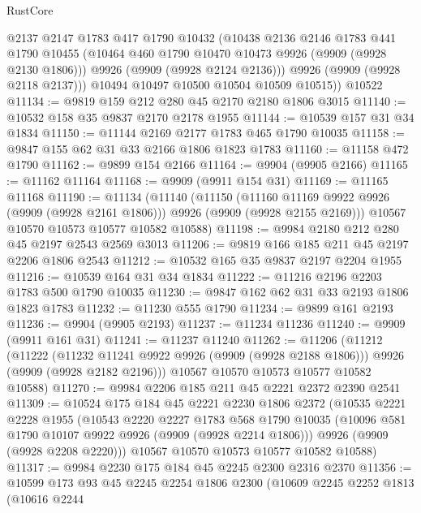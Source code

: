 \begin{lexlean}{RustCore}
\begin{coremodule}
          @2137
          @2147
          @1783
          @417
          @1790
          @10432
          (@10438
            @2136
            @2146
            @1783
            @441
            @1790
            @10455
            (@10464 @460 @1790 @10470 @10473 @9926 (@9909 (@9928 @2130 @1806)))
            @9926
            (@9909 (@9928 @2124 @2136)))
          @9926
          (@9909 (@9928 @2118 @2137)))
        @10494
        @10497
        @10500
        @10504
        @10509
        @10515))
    @10522
@11134 := @9819 @159 @212 @280 @45 @2170 @2180 @1806 @3015
@11140 := @10532 @158 @35 @9837 @2170 @2178 @1955
@11144 := @10539 @157 @31 @34 @1834
@11150 := @11144 @2169 @2177 @1783 @465 @1790 @10035
@11158 := @9847 @155 @62 @31 @33 @2166 @1806 @1823 @1783
@11160 := @11158 @472 @1790
@11162 := @9899 @154 @2166
@11164 := @9904 (@9905 @2166)
@11165 := @11162 @11164
@11168 := @9909 (@9911 @154 @31)
@11169 := @11165 @11168
@11190 := @11134
    (@11140
      (@11150
        (@11160 @11169 @9922 @9926 (@9909 (@9928 @2161 @1806)))
        @9926
        (@9909 (@9928 @2155 @2169)))
      @10567
      @10570
      @10573
      @10577
      @10582
      @10588)
@11198 := @9984 @2180 @212 @280 @45 @2197 @2543 @2569 @3013
@11206 := @9819 @166 @185 @211 @45 @2197 @2206 @1806 @2543
@11212 := @10532 @165 @35 @9837 @2197 @2204 @1955
@11216 := @10539 @164 @31 @34 @1834
@11222 := @11216 @2196 @2203 @1783 @500 @1790 @10035
@11230 := @9847 @162 @62 @31 @33 @2193 @1806 @1823 @1783
@11232 := @11230 @555 @1790
@11234 := @9899 @161 @2193
@11236 := @9904 (@9905 @2193)
@11237 := @11234 @11236
@11240 := @9909 (@9911 @161 @31)
@11241 := @11237 @11240
@11262 := @11206
    (@11212
      (@11222
        (@11232 @11241 @9922 @9926 (@9909 (@9928 @2188 @1806)))
        @9926
        (@9909 (@9928 @2182 @2196)))
      @10567
      @10570
      @10573
      @10577
      @10582
      @10588)
@11270 := @9984 @2206 @185 @211 @45 @2221 @2372 @2390 @2541
@11309 := @10524
    @175
    @184
    @45
    @2221
    @2230
    @1806
    @2372
    (@10535
      @2221
      @2228
      @1955
      (@10543
        @2220
        @2227
        @1783
        @568
        @1790
        @10035
        (@10096 @581 @1790 @10107 @9922 @9926 (@9909 (@9928 @2214 @1806)))
        @9926
        (@9909 (@9928 @2208 @2220)))
      @10567
      @10570
      @10573
      @10577
      @10582
      @10588)
@11317 := @9984 @2230 @175 @184 @45 @2245 @2300 @2316 @2370
@11356 := @10599
    @173
    @93
    @45
    @2245
    @2254
    @1806
    @2300
    (@10609
      @2245
      @2252
      @1813
      (@10616
        @2244

\end{coremodule}
\end{lexlean}
